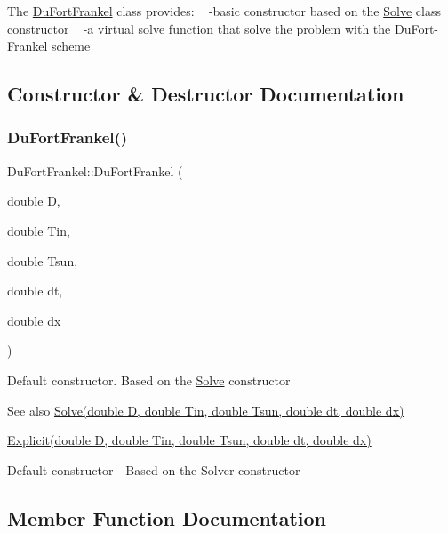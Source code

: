 The \hyperlink{class_du_fort_frankel}{Du\+Fort\+Frankel} class provides\+: ~\newline
-\/basic constructor based on the \hyperlink{class_solve}{Solve} class constructor ~\newline
-\/a virtual solve function that solve the problem with the Du\+Fort-\/\+Frankel scheme 

\subsection{Constructor \& Destructor Documentation}
\mbox{\label{class_du_fort_frankel_ab9a6490d0fd3b08e7e22fba2ade16c19}} 
\subsubsection{\texorpdfstring{Du\+Fort\+Frankel()}{DuFortFrankel()}}
{\footnotesize\ttfamily Du\+Fort\+Frankel\+::\+Du\+Fort\+Frankel (\begin{DoxyParamCaption}\item[{double}]{D,  }\item[{double}]{Tin,  }\item[{double}]{Tsun,  }\item[{double}]{dt,  }\item[{double}]{dx }\end{DoxyParamCaption})}

Default constructor. Based on the \hyperlink{class_solve}{Solve} constructor \begin{DoxySeeAlso}{See also}
\hyperlink{class_solve_a1e0efad6dcf6b09759dd38df7aa08db8}{Solve(double D, double Tin, double Tsun, double dt, double dx)} 

\hyperlink{class_explicit_ab5b890fae2ea8a91c95e9a15f552f36a}{Explicit(double D, double Tin, double Tsun, double dt, double dx)}
\end{DoxySeeAlso}
Default constructor -\/ Based on the Solver constructor 

\subsection{Member Function Documentation}
\mbox{\label{class_du_fort_frankel_a73204223c7ace1e3f95e5d89d02c5208}} 
